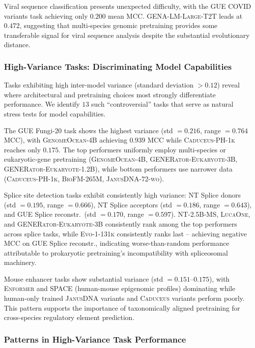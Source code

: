 \documentclass{article}
\theoremstyle{plain}
\theoremstyle{definition}
\theoremstyle{remark}
\begin{document}
Viral sequence classification presents unexpected difficulty,
with the GUE COVID variants task achieving only $0.200$ mean
MCC. \textsc{GENA-LM-Large-T2T} leads at $0.472$, suggesting
that multi-species genomic pretraining provides some
transferable signal for viral sequence analysis despite the
substantial evolutionary distance.

\subsubsection{High-Variance Tasks: Discriminating Model
Capabilities}

Tasks exhibiting high inter-model variance (standard deviation
$> 0.12$) reveal where architectural and pretraining choices
most strongly differentiate performance. We identify $13$ such
``controversial'' tasks that serve as natural stress tests for
model capabilities.

The GUE Fungi-20 task shows the highest variance (std $=
0.216$, range $= 0.764$ MCC), with \textsc{GenomeOcean-4B}
achieving $0.939$ MCC while \textsc{Caduceus-PH-1k} reaches only
$0.175$. The top performers uniformly employ multi-species or
eukaryotic-gene pretraining (\textsc{GenomeOcean-4B},
\textsc{GENERator-Eukaryote-3B},
\textsc{GENERator-Eukaryote-1.2B}), while bottom performers use
narrower data (\textsc{Caduceus-PH-1k}, \textsc{BioFM-265M},
\textsc{JanusDNA-72-wo}).

Splice site detection tasks exhibit consistently high variance:
NT Splice donors (std $= 0.195$, range $= 0.666$), NT Splice
acceptors (std $= 0.186$, range $= 0.643$), and GUE Splice
reconstr.\ (std $= 0.170$, range $= 0.597$). \textsc{NT-2.5B-MS},
\textsc{LucaOne}, and \textsc{GENERator-Eukaryote-3B}
consistently rank among the top performers across splice tasks,
while \textsc{Evo-1-131k} consistently ranks last -- achieving
negative MCC on GUE Splice reconstr., indicating
worse-than-random performance attributable to prokaryotic
pretraining's incompatibility with spliceosomal machinery.

Mouse enhancer tasks show substantial variance (std $=
0.151$--$0.175$), with \textsc{Enformer} and \textsc{SPACE}
(human-mouse epigenomic profiles) dominating while human-only
trained \textsc{JanusDNA} variants and \textsc{Caduceus} variants
perform poorly. This pattern supports the importance of
taxonomically aligned pretraining for cross-species regulatory
element prediction.

\subsubsection{Patterns in High-Variance Task Performance}
\end{document}
